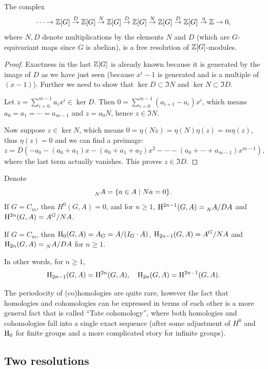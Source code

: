 \begin{thm}
    The complex
    \[\cdots\to \mathbb{Z}[G]\overset{D}{\to} \mathbb{Z}[G]\overset{N}{\to}\mathbb{Z}[G]\overset{D}{\to}\mathbb{Z}[G]\overset{N}{\to}\mathbb{Z}[G]\overset{D}{\to}\mathbb{Z}[G]\overset{\eta}{\to}\mathbb{Z}\to 0,\]
    where $N,D$ denote multiplications by the elements $N$ and $D$ (which are $G$-equivariant maps since $G$ is abelian), is a free resolution of $\mathbb{Z}[G]$-modules.
\end{thm}
\begin{proof}
    Exactness in the last $\mathbb{Z}[G]$ is already known because it is generated by the image of $D$ as we have just seen (because $x^i-1$ is generated and is a multiple of $(x-1)$). Further we need to show that $\ker D\subset \Im N$ and $\ker N\subset \Im D$. 

    Let $z=\sum_{i=0}^{m-1}a_ix^i\in\ker D$. Then $0=\sum_{i=0}^{m-1}(a_{i+1}-a_i)x^i$, which means $a_0=a_1=\cdots=a_{m-1}$ and $z=a_0 N$, hence $z\in \Im N$.

    Now suppose $z\in \ker N$, which means $0=\eta(Nz)=\eta(N)\eta(z)=m\eta(z)$, thus $\eta(z)=0$ and we can find a preimage:
    \[z=D(-a_0-(a_0+a_1)x-(a_0+a_1+a_2)x^2-\cdots -(a_0+\cdots +a_{m-1})x^{m-1}),\]
    where the last term actually vanishes. This proves $z\in \Im D$.
\end{proof}
\begin{cor}
    Denote
    \[\prescript{}{N}{A}=\{a\in A\mid Na=0\}.\]
    If $G=C_m$, then $H^0(G,A)=0$, and for $n\geq 1$, $\mathrm{H}^{2n-1}(G,A)=\prescript{}{N}{A}\slash DA$ and $\mathrm{H}^{2n}(G,A)=A^G\slash NA$.
\end{cor}
\begin{cor}
    If $G=C_m$, then $\mathrm{H}_0(G,A)=A_G=A\slash (I_G\cdot A)$, $\mathrm{H}_{2n-1}(G,A)=A^G\slash NA$ and $\mathrm{H}_{2n}(G,A)=\prescript{}{N}{A}\slash DA$ for $n\geq 1$.

    In other words, for $n\geq 1$,
    \[\mathrm{H}_{2n-1}(G,A)=\mathrm{H}^{2n}(G,A),\quad \mathrm{H}_{2n}(G,A)=\mathrm{H}^{2n-1}(G,A).\]
\end{cor}
\begin{rem}
    The periodocity of (co)homologies are quite rare, however the fact that homologies and cohomologies can be expressed in terms of each other is a more general fact that is called ``Tate cohomology'', where both homologies and cohomologies fall into a single exact sequence (after some adjustment of $H^0$ and $\mathrm{H}_0$ for finite groups and a more complicated story for infinite groups). 
\end{rem}


\subsection{Two resolutions}

